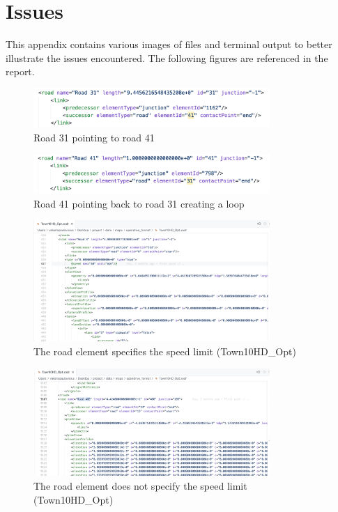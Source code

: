 \chapter{Issues} \label{chap:c}

This appendix contains various images of files and terminal output to better illustrate the issues encountered. The following figures are referenced in the report.
\vspace{15pt}
\begin{figure} [h]
    \centering
    \includegraphics[width = 0.8\textwidth]{research_paper/Images/road_31.png}
    \caption{Road 31 pointing to road 41}
    \label{fig:road_31}
\end{figure}

\begin{figure} [h]
    \centering
    \includegraphics[width = 0.8\textwidth]{research_paper/Images/road_41.png}
    \caption{Road 41 pointing back to road 31 creating a loop}
    \label{fig:road_41}
\end{figure}

\begin{figure} [h]
    \centering
    \includegraphics[width = 0.8\textwidth]{research_paper/Images/speed_yes.png}
    \caption{The road element specifies the speed limit (Town10HD\_Opt)}
    \label{fig:speed_yes}
\end{figure}

\begin{figure} [h]
    \centering
    \includegraphics[width = 0.8\textwidth]{research_paper/Images/speed_no.png}
    \caption{The road element does not specify the speed limit (Town10HD\_Opt)}
    \label{fig:speed_no}
\end{figure}

